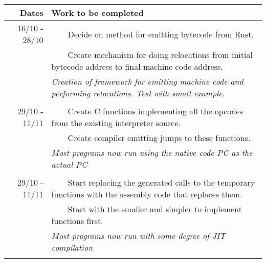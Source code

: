 \documentclass[12pt,a4paper, headings=standardclasses]{scrartcl}
\newcommand{\tabitem}{~~\llap{\textbullet}~~}
\begin{document}
\begin{tabularx}{\textwidth}{rX} \toprule
    Dates & Work to be completed                                                                                               \\ \midrule
    16/10 - 28/10
          & \tabitem Decide on method for emitting bytecode from Rust.                                                         \\
          & \tabitem Create mechanism for doing relocations from initial bytecode address to final machine code address.       \\
          & \textit{Creation of framework for emitting machine code and performing relocations. Test with small example.}      \\

          &                                                                                                                    \\

    29/10 - 11/11
          & \tabitem Create C functions implementing all the opcodes from the existing interpreter source.                     \\
          & \tabitem Create compiler emitting jumps to these functions.                                                        \\
          & \textit{Most programs now run using the native code PC as the actual PC}                                           \\

          &                                                                                                                    \\

    29/10 - 11/11
          & \tabitem Start replacing the generated calls to the temporary functions with the assembly code that replaces them. \\
          & \tabitem Start with the smaller and simpler to implement functions first.                                          \\
          & \textit{Most programs now run with some degree of JIT compilation}                                                 \\

          &                                                                                                                    \\


\end{tabularx}
\end{document}
